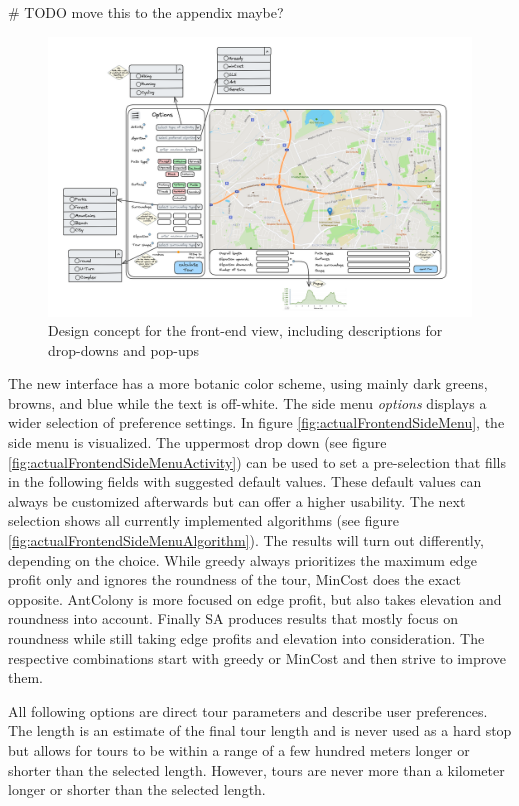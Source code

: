 \# TODO move this to the appendix maybe?
\begin{figure}[H]
	\includegraphics[width=0.9\linewidth]{bilder/Concept new Frontend design.png}
	\caption{Design concept for the front-end view, including descriptions for drop-downs and pop-ups}
	\label{fig:frontendConcept}
\end{figure}



The new interface has a more botanic color scheme, using mainly dark greens, browns, and blue while the text is off-white.
The side menu \textit{options} displays a wider selection of preference settings.
In figure \ref{fig:actualFrontendSideMenu}, the side menu is visualized. 
The uppermost drop down (see figure \ref{fig:actualFrontendSideMenuActivity}) can be used to set a pre-selection that fills in the following fields with suggested default values. 
These default values can always be customized afterwards but can offer a higher usability.
The next selection shows all currently implemented algorithms (see figure \ref{fig:actualFrontendSideMenuAlgorithm}).
The results will turn out differently, depending on the choice.
While greedy always prioritizes the maximum edge profit only and ignores the roundness of the tour, MinCost does the exact opposite.
AntColony is more focused on edge profit, but also takes elevation and roundness into account.
Finally SA produces results that mostly focus on roundness while still taking edge profits and elevation into consideration. 
The respective combinations start with greedy or MinCost and then strive to improve them. 

All following options are direct tour parameters and describe user preferences.
The length is an estimate of the final tour length and is never used as a hard stop but allows for tours to be within a range of a few hundred meters longer or shorter than the selected length.
However, tours are never more than a kilometer longer or shorter than the selected length.


